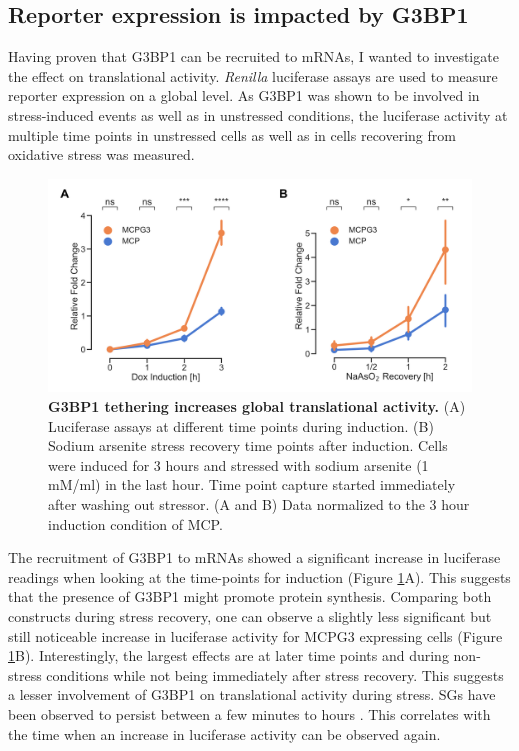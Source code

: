 \subsection{Reporter expression is impacted by G3BP1} \label{mcp_luciferase}

Having proven that G3BP1 can be recruited to mRNAs, I wanted to investigate the effect on translational activity. \textit{Renilla} luciferase assays are used to measure reporter expression on a global level.
As G3BP1 was shown to be involved in stress-induced events as well as in unstressed conditions, the luciferase activity at multiple time points in unstressed cells as well as in cells recovering from oxidative stress was measured.

\begin{figure}[t!]
    \centering
    \includegraphics[width=\linewidth]{images/figure3}
    \caption{\textbf{G3BP1 tethering increases global translational activity.}
        (A) Luciferase assays at different time points during induction.
        (B) Sodium arsenite stress recovery time points after induction.
            Cells were induced for 3 hours and stressed with sodium arsenite (1 mM/ml) in the last hour.
            Time point capture started immediately after washing out stressor.
        (A and B) Data normalized to the 3 hour induction condition of MCP.     
    }
    \label{fig:mcp_luciferase}
\end{figure}

The recruitment of G3BP1 to mRNAs showed a significant increase in luciferase readings when looking at the time-points for induction (Figure \ref{fig:mcp_luciferase}A).
This suggests that the presence of G3BP1 might promote protein synthesis.
Comparing both constructs during stress recovery, one can observe a slightly less significant but still noticeable increase in luciferase activity for MCPG3 expressing cells (Figure \ref{fig:mcp_luciferase}B).
Interestingly, the largest effects are at later time points and during non-stress conditions while not being immediately after stress recovery.
This suggests a lesser involvement of G3BP1 on translational activity during stress.
SGs have been observed to persist between a few minutes to hours \cite{chen_relationships_2017}.
This correlates with the time when an increase in luciferase activity can be observed again.


